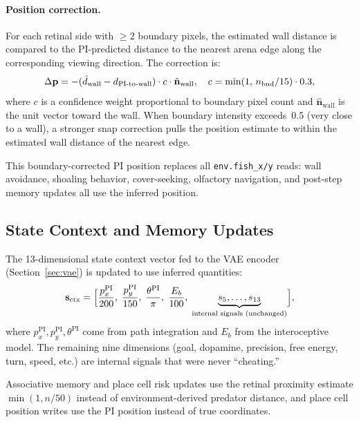 \documentclass[11pt,a4paper]{article}
\begin{document}
\paragraph{Position correction.}
For each retinal side with $\geq 2$ boundary pixels, the estimated wall
distance is compared to the PI-predicted distance to the nearest arena
edge along the corresponding viewing direction.
The correction is:
\begin{equation}\label{eq:position_correction}
  \Delta\mathbf{p} = -(\hat{d}_\text{wall} - d_\text{PI\text{-}to\text{-}wall})
    \cdot c \cdot \hat{\mathbf{n}}_\text{wall},
  \quad c = \min(1,\, n_\text{bnd}/15) \cdot 0.3,
\end{equation}
where $c$ is a confidence weight proportional to boundary pixel count and
$\hat{\mathbf{n}}_\text{wall}$ is the unit vector toward the wall.
When boundary intensity exceeds~0.5 (very close to a wall), a stronger
snap correction pulls the position estimate to within the estimated
wall distance of the nearest edge.

This boundary-corrected PI position replaces all \texttt{env.fish\_x/y}
reads: wall avoidance, shoaling behavior, cover-seeking, olfactory
navigation, and post-step memory updates all use the inferred position.

\subsection{State Context and Memory Updates}\label{sec:state_ctx_ai}

The 13-dimensional state context vector fed to the VAE encoder
(Section~\ref{sec:vae}) is updated to use inferred quantities:
\begin{equation}\label{eq:state_ctx_ai}
  \mathbf{s}_\text{ctx} = \Bigl[
    \frac{p_x^\text{PI}}{200},\;
    \frac{p_y^\text{PI}}{150},\;
    \frac{\theta^\text{PI}}{\pi},\;
    \frac{E_b}{100},\;
    \underbrace{s_5, \ldots, s_{13}}_{\text{internal signals (unchanged)}}
  \Bigr],
\end{equation}
where $p_x^\text{PI}, p_y^\text{PI}, \theta^\text{PI}$ come from path
integration and $E_b$ from the interoceptive model.
The remaining nine dimensions (goal, dopamine, precision, free energy,
turn, speed, etc.) are internal signals that were never ``cheating.''

Associative memory and place cell risk updates use the retinal proximity
estimate $\min(1, n/50)$ instead of environment-derived predator distance,
and place cell position writes use the PI position instead of true coordinates.
\end{document}
